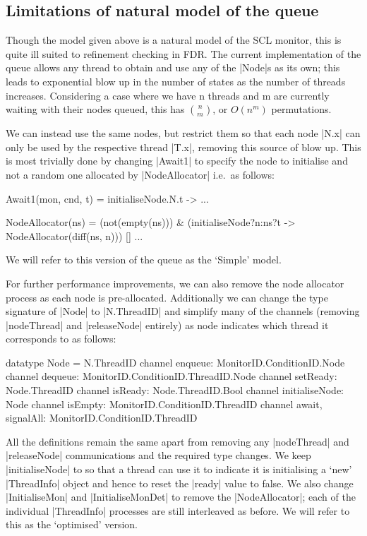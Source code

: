 \subsection{Limitations of natural model of the queue}

Though the model given above is a natural model of the SCL monitor, this is quite ill suited to refinement checking in FDR. The current implementation of the queue allows any thread to obtain and use any of the |Node|s as its own; this leads to exponential blow up in the number of states as the number of threads increases. Considering a case where we have n threads and m are currently waiting with their nodes queued, this has $n\choose{m}$, or $O(n^{m})$ permutations.

We can instead use the same nodes, but restrict them so that each node |N.x| can only be used by the respective thread |T.x|, removing this source of blow up. This is most trivially done by changing |Await1| to specify the node to initialise and not a random one allocated by |NodeAllocator| i.e.~as follows:

\begin{cspm}
  Await1(mon, cnd, t) = initialiseNode.N.t -> ...

  NodeAllocator(ns) = 
      (not(empty(ns))) & (initialiseNode?n:ns?t -> NodeAllocator(diff(ns, {n}))) 
   [] ...
\end{cspm}

We will refer to this version of the queue as the `Simple' model.

For further performance improvements, we can also remove the node allocator process as each node is pre-allocated. Additionally we can change the type signature of |Node| to |N.ThreadID| and simplify many of the channels (removing |nodeThread| and |releaseNode| entirely) as node indicates which thread it corresponds to as follows:

\begin{cspm}
  datatype Node = N.ThreadID
  channel enqueue: MonitorID.ConditionID.Node 
  channel dequeue: MonitorID.ConditionID.ThreadID.Node
  channel setReady: Node.ThreadID
  channel isReady: Node.ThreadID.Bool
  channel initialiseNode: Node
  channel isEmpty: MonitorID.ConditionID.ThreadID
  channel await, signalAll: MonitorID.ConditionID.ThreadID
\end{cspm}

All the definitions remain the same apart from removing any |nodeThread| and |releaseNode| communications and the required type changes. We keep |initialiseNode| to so that a thread can use it to indicate it is initialising a `new' |ThreadInfo| object and hence to reset the |ready| value to false. We also change |InitialiseMon| and |InitialiseMonDet| to remove the |NodeAllocator|; each of the individual |ThreadInfo| processes are still interleaved as before. We will refer to this as the `optimised' version.

